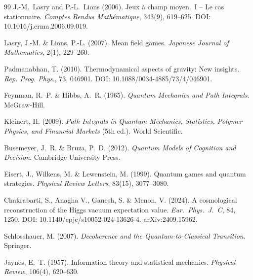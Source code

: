 \documentclass[12pt,a4paper]{article}
\theoremstyle{remark}
\begin{document}
{\begin{thebibliography}{99}
J.-M.~Lasry and P.-L.~Lions (2006).
\newblock Jeux \`a champ moyen.\ I -- Le cas stationnaire.
\newblock \textit{Comptes Rendus Math\'ematique}, 343(9), 619--625.
\newblock DOI: 10.1016/j.crma.2006.09.019.

Lasry, J.-M. \& Lions, P.-L. (2007).
\newblock Mean field games.
\newblock \textit{Japanese Journal of Mathematics}, 2(1), 229--260.

Padmanabhan, T. (2010).
\newblock Thermodynamical aspects of gravity: New insights.
\newblock \textit{Rep. Prog. Phys.}, 73, 046901.
\newblock DOI: 10.1088/0034-4885/73/4/046901.

Feynman, R.~P. \& Hibbs, A.~R. (1965).
\newblock \textit{Quantum Mechanics and Path Integrals}.
\newblock McGraw-Hill.

Kleinert, H. (2009).
\newblock \textit{Path Integrals in Quantum Mechanics, Statistics, Polymer Physics, and Financial Markets} (5th ed.).
\newblock World Scientific.


Busemeyer, J.~R. \& Bruza, P.~D. (2012).
\newblock \textit{Quantum Models of Cognition and Decision}.
\newblock Cambridge University Press.

Eisert, J., Wilkens, M. \& Lewenstein, M. (1999).
\newblock Quantum games and quantum strategies.
\newblock \textit{Physical Review Letters}, 83(15), 3077--3080.

Chakrabarti, S., Anagha V., Ganesh, S. \& Menon, V. (2024).
\newblock A cosmological reconstruction of the {H}iggs vacuum expectation value.
\newblock \textit{Eur.\ Phys.\ J.\ C}, 84, 1250.
\newblock DOI: 10.1140/epjc/s10052-024-13626-4. arXiv:2409.15962.

Schlosshauer, M. (2007).
\newblock \textit{Decoherence and the Quantum-to-Classical Transition}.
\newblock Springer.

Jaynes, E.~T. (1957).
\newblock Information theory and statistical mechanics.
\newblock \textit{Physical Review}, 106(4), 620--630.


\end{thebibliography}}
\end{document}
